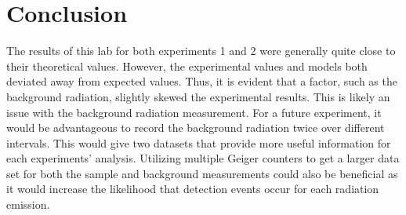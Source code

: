 \documentclass[
	letterpaper, %
	10pt, %
]{CSUniSchoolLabReport}
\begin{document}
\section{Conclusion}
\vspace{20pt}
The results of this lab for both experiments 1 and 2 were generally quite close to their theoretical values.
However, the experimental values and models both deviated away from expected values. Thus, it is evident that a factor, such as the background radiation, slightly skewed the experimental results. This is likely an issue with the background radiation measurement. For a future experiment, it would be advantageous to record the background radiation twice over different intervals. This would give two datasets that provide more useful information for each experiments' analysis.
Utilizing multiple Geiger counters to get a larger data set for both the sample and background measurements could also be beneficial as it would increase the likelihood that detection events occur for each radiation emission.
\vspace{20pt}
\end{document}
